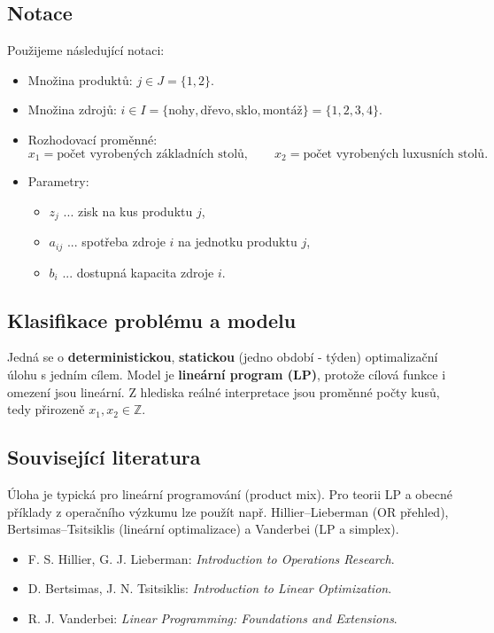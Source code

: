 \documentclass[../sablona-main.tex]{subfiles}
\begin{document}
	\subsection{Notace}
	Použijeme následující notaci:
	
	\begin{itemize}
		\item Množina produktů: $j \in J=\{1,2\}$.
		\item Množina zdrojů: $i \in I=\{\text{nohy},\text{dřevo},\text{sklo},\text{montáž}\} = \{1,2,3,4\} $.
		\item Rozhodovací proměnné:
		\[
		x_1 = \text{počet vyrobených základních stolů},\qquad
		x_2 = \text{počet vyrobených luxusních stolů}.
		\]
		\item Parametry:
		\begin{itemize}
			\item $z_j$ ... zisk na kus produktu $j$,
			\item $a_{ij}$ ... spotřeba zdroje $i$ na jednotku produktu $j$,
			\item $b_i$ ... dostupná kapacita zdroje $i$.
		\end{itemize}
	\end{itemize}
	
	\subsection{Klasifikace problému a modelu}
	Jedná se o \textbf{deterministickou}, \textbf{statickou} (jedno období -
	týden) optimalizační úlohu s jedním cílem.
	Model je \textbf{lineární program (LP)}, protože cílová funkce i omezení jsou lineární.
	Z hlediska reálné interpretace jsou proměnné počty kusů, tedy přirozeně $x_1,x_2\in\mathbb{Z}$.
	
	\subsection{Související literatura}
	Úloha je typická pro lineární programování (product mix). Pro teorii LP a obecné příklady z operačního výzkumu lze použít např. Hillier–Lieberman (OR přehled), Bertsimas–Tsitsiklis (lineární optimalizace) a Vanderbei (LP a simplex).
	\begin{itemize}
		\item F. S. Hillier, G. J. Lieberman: \emph{Introduction to Operations Research}.
		\item D. Bertsimas, J. N. Tsitsiklis: \emph{Introduction to Linear Optimization}.
		\item R. J. Vanderbei: \emph{Linear Programming: Foundations and Extensions}.
	\end{itemize}
\end{document}
